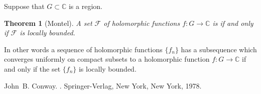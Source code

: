 \documentclass[12pt]{article}
\theoremstyle{theorem}
\newtheorem*{thm}{Theorem}
\theoremstyle{definition}
\begin{document}
Suppose that $G \subset {\mathbb{C}}$ is a region.

\begin{thm}[Montel]
A set ${\mathcal{F}}$ of holomorphic functions $f\colon G \to {\mathbb{C}}$ is  if and only if ${\mathcal{F}}$ is
locally bounded.
\end{thm}

In other words a sequence of holomorphic functions $\{ f_n \}$ has a subsequence which converges uniformly 
on compact subsets to a holomorphic function $f \colon G \to {\mathbb{C}}$
if and only if the set $\{ f_n \}$ is locally bounded.

\begin{thebibliography}{9}
John~B. Conway.
{\em {}}.
Springer-Verlag, New York, New York, 1978.
\end{thebibliography}
\end{document}
